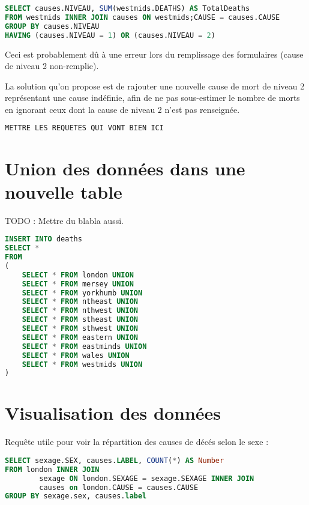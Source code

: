     \begin{lstlisting}[frame=single, language=SQL]
SELECT causes.NIVEAU, SUM(westmids.DEATHS) AS TotalDeaths
FROM westmids INNER JOIN causes ON westmids;CAUSE = causes.CAUSE
GROUP BY causes.NIVEAU
HAVING (causes.NIVEAU = 1) OR (causes.NIVEAU = 2)
    \end{lstlisting}

    Ceci est probablement dû à une erreur lors du remplissage des formulaires (cause de niveau 2 non-remplie).

    La solution qu'on propose est de rajouter une nouvelle cause de mort de niveau 2 représentant une cause indéfinie, afin
    de ne pas sous-estimer le nombre de morts en ignorant ceux dont la cause de niveau 2 n'est pas renseignée.

    \begin{lstlisting}[frame=single, language=SQL]
METTRE LES REQUETES QUI VONT BIEN ICI
    \end{lstlisting}

\section{Union des données dans une nouvelle table}

    TODO : Mettre du blabla aussi.

    \begin{lstlisting}[frame=single, language=SQL]
INSERT INTO deaths
SELECT *
FROM
(
    SELECT * FROM london UNION
    SELECT * FROM mersey UNION
    SELECT * FROM yorkhumb UNION
    SELECT * FROM ntheast UNION
    SELECT * FROM nthwest UNION
    SELECT * FROM stheast UNION
    SELECT * FROM sthwest UNION
    SELECT * FROM eastern UNION
    SELECT * FROM eastminds UNION
    SELECT * FROM wales UNION
    SELECT * FROM westmids UNION
)
    \end{lstlisting}


\section{Visualisation des données}

Requête utile pour voir la répartition des causes de décés selon le sexe :

\begin{lstlisting}[frame=single, language=SQL]
SELECT sexage.SEX, causes.LABEL, COUNT(*) AS Number
FROM london INNER JOIN
        sexage ON london.SEXAGE = sexage.SEXAGE INNER JOIN
        causes on london.CAUSE = causes.CAUSE
GROUP BY sexage.sex, causes.label
\end{lstlisting}